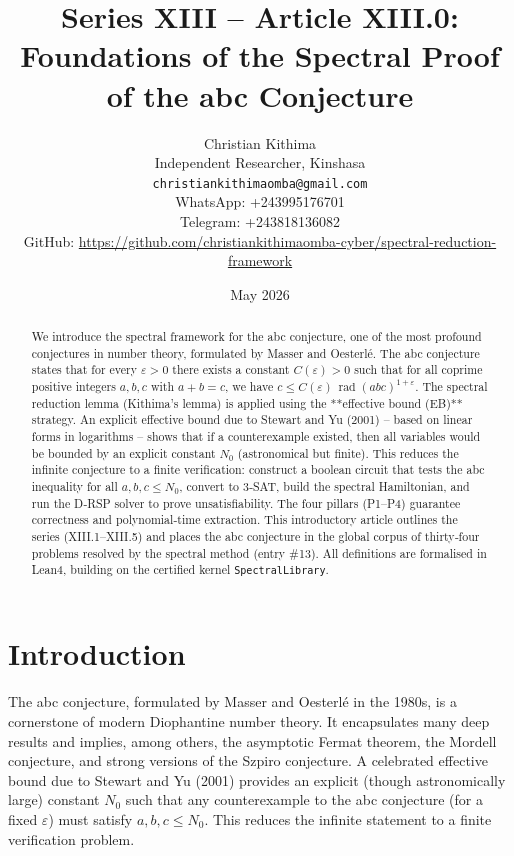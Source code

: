 \documentclass[11pt,a4paper]{article}
\title{Series XIII – Article XIII.0: Foundations of the Spectral Proof of the abc Conjecture}
\author{Christian Kithima \\
Independent Researcher, Kinshasa \\
\texttt{christiankithimaomba@gmail.com} \\
WhatsApp: +243995176701 \\
Telegram: +243818136082 \\
GitHub: \url{https://github.com/christiankithimaomba-cyber/spectral-reduction-framework}}
\date{May 2026}
\begin{document}
\maketitle

\begin{abstract}
We introduce the spectral framework for the abc conjecture, one of the most profound conjectures in number theory, formulated by Masser and Oesterlé. The abc conjecture states that for every $\varepsilon>0$ there exists a constant $C(\varepsilon)>0$ such that for all coprime positive integers $a,b,c$ with $a+b=c$, we have $c \le C(\varepsilon)\,\operatorname{rad}(abc)^{1+\varepsilon}$. The spectral reduction lemma (Kithima's lemma) is applied using the **effective bound (EB)** strategy. An explicit effective bound due to Stewart and Yu (2001) – based on linear forms in logarithms – shows that if a counterexample existed, then all variables would be bounded by an explicit constant $N_0$ (astronomical but finite). This reduces the infinite conjecture to a finite verification: construct a boolean circuit that tests the abc inequality for all $a,b,c \le N_0$, convert to 3‑SAT, build the spectral Hamiltonian, and run the D‑RSP solver to prove unsatisfiability. The four pillars (P1–P4) guarantee correctness and polynomial‑time extraction. This introductory article outlines the series (XIII.1–XIII.5) and places the abc conjecture in the global corpus of thirty‑four problems resolved by the spectral method (entry \#13). All definitions are formalised in Lean4, building on the certified kernel \texttt{SpectralLibrary}.
\end{abstract}

\tableofcontents

\section{Introduction}

The abc conjecture, formulated by Masser and Oesterlé in the 1980s, is a cornerstone of modern Diophantine number theory. It encapsulates many deep results and implies, among others, the asymptotic Fermat theorem, the Mordell conjecture, and strong versions of the Szpiro conjecture. A celebrated effective bound due to Stewart and Yu (2001) provides an explicit (though astronomically large) constant $N_0$ such that any counterexample to the abc conjecture (for a fixed $\varepsilon$) must satisfy $a,b,c \le N_0$. This reduces the infinite statement to a finite verification problem.
\end{document}
